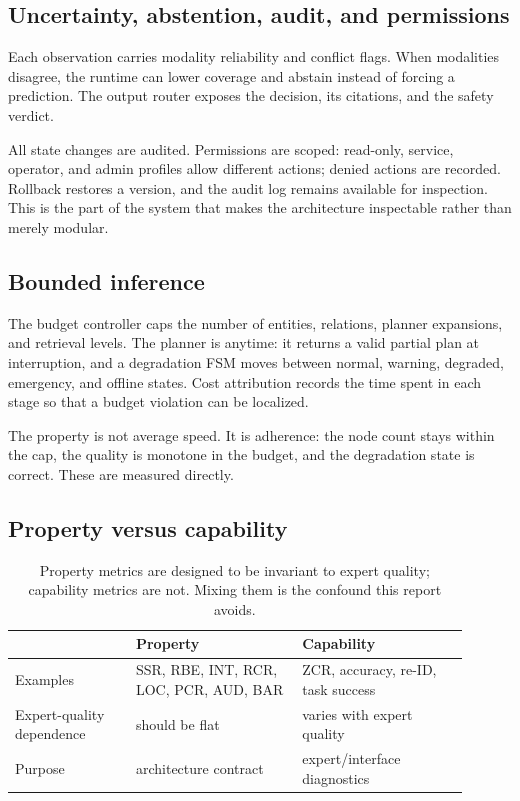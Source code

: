 \documentclass[10pt]{article}
\begin{document}
\subsection{Uncertainty, abstention, audit, and permissions}

Each observation carries modality reliability and conflict flags. When
modalities disagree, the runtime can lower coverage and abstain instead of
forcing a prediction. The output router exposes the decision, its citations,
and the safety verdict.

All state changes are audited. Permissions are scoped: read-only, service,
operator, and admin profiles allow different actions; denied actions are
recorded. Rollback restores a version, and the audit log remains available for
inspection. This is the part of the system that makes the architecture
inspectable rather than merely modular.

\subsection{Bounded inference}

The budget controller caps the number of entities, relations, planner
expansions, and retrieval levels. The planner is anytime: it returns a valid
partial plan at interruption, and a degradation FSM moves between normal,
warning, degraded, emergency, and offline states. Cost attribution records the
time spent in each stage so that a budget violation can be localized.

The property is not average speed. It is adherence: the node count stays within
the cap, the quality is monotone in the budget, and the degradation state is
correct. These are measured directly.

\subsection{Property versus capability}

\begin{table}[t]
\centering
\small
\begin{tabular}{@{}p{0.24\linewidth}p{0.33\linewidth}p{0.33\linewidth}@{}}
\toprule
 & \textbf{Property} & \textbf{Capability} \\
\midrule
Examples & SSR, RBE, INT, RCR, LOC, PCR, AUD, BAR & ZCR, accuracy, re-ID, task success \\
Expert-quality dependence & should be flat & varies with expert quality \\
Purpose & architecture contract & expert/interface diagnostics \\
\bottomrule
\end{tabular}
\caption{Property metrics are designed to be invariant to expert quality;
capability metrics are not. Mixing them is the confound this report avoids.}
\label{tab:property-capability}
\end{table}
\end{document}
